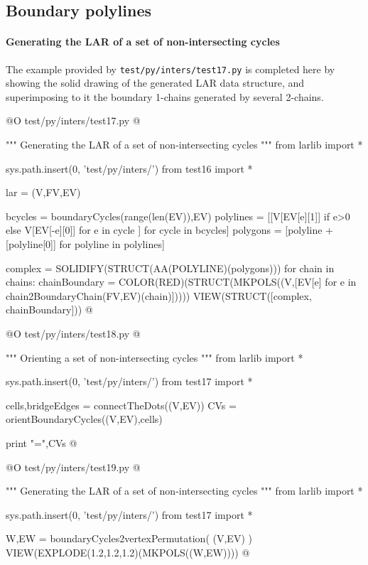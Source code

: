 \documentclass[11pt,oneside]{article}    %
\begin{document}
\subsection{Boundary polylines}

\paragraph{Generating the LAR of a set of non-intersecting cycles}
The example provided by \texttt{test/py/inters/test17.py} is completed here
by showing the solid drawing of the generated LAR data structure, and superimposing to it 
the boundary 1-chains generated by several 2-chains.

@O test/py/inters/test17.py
@{""" Generating the LAR of a set of non-intersecting cycles """
from larlib import *

sys.path.insert(0, 'test/py/inters/')
from test16 import *

lar = (V,FV,EV)

bcycles = boundaryCycles(range(len(EV)),EV)
polylines = [[V[EV[e][1]] if e>0 else V[EV[-e][0]] for e in cycle ] for cycle in bcycles]
polygons = [polyline + [polyline[0]] for polyline in polylines]

complex = SOLIDIFY(STRUCT(AA(POLYLINE)(polygons)))
for chain in chains:
    chainBoundary = COLOR(RED)(STRUCT(MKPOLS((V,[EV[e] 
                        for e in chain2BoundaryChain(FV,EV)(chain)]))))
    VIEW(STRUCT([complex, chainBoundary]))
@}

@O test/py/inters/test18.py
@{""" Orienting a set of non-intersecting cycles """
from larlib import *

sys.path.insert(0, 'test/py/inters/')
from test17 import *

cells,bridgeEdges = connectTheDots((V,EV))
CVs = orientBoundaryCycles((V,EV),cells)

print "\nCVs =",CVs
@}

@O test/py/inters/test19.py
@{""" Generating the LAR of a set of non-intersecting cycles """
from larlib import *

sys.path.insert(0, 'test/py/inters/')
from test17 import *

W,EW = boundaryCycles2vertexPermutation( (V,EV) )
VIEW(EXPLODE(1.2,1.2,1.2)(MKPOLS((W,EW))))
@}
\end{document}
